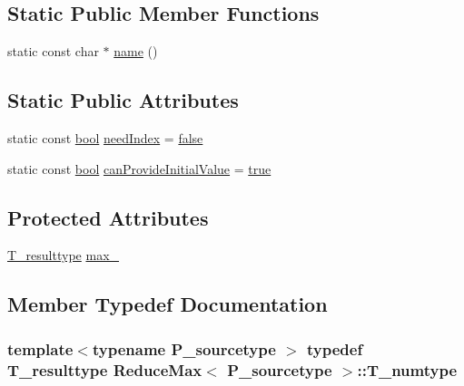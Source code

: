 \subsection*{Static Public Member Functions}
\begin{DoxyCompactItemize}
\item 
static const char $\ast$ \hyperlink{classReduceMax_abd39784338daade53da235c5cde658b5}{name} ()
\end{DoxyCompactItemize}
\subsection*{Static Public Attributes}
\begin{DoxyCompactItemize}
\item 
static const \hyperlink{compiler_8h_abb452686968e48b67397da5f97445f5b}{bool} \hyperlink{classReduceMax_a1826b9280463d17acf648acbbf255e5e}{need\+Index} = \hyperlink{compiler_8h_a65e9886d74aaee76545e83dd09011727}{false}
\item 
static const \hyperlink{compiler_8h_abb452686968e48b67397da5f97445f5b}{bool} \hyperlink{classReduceMax_a335c4053d878c33241d52e7a86656135}{can\+Provide\+Initial\+Value} = \hyperlink{compiler_8h_a41f9c5fb8b08eb5dc3edce4dcb37fee7}{true}
\end{DoxyCompactItemize}
\subsection*{Protected Attributes}
\begin{DoxyCompactItemize}
\item 
\hyperlink{classReduceMax_a5e86077304fc95a12800e10c2059f88a}{T\+\_\+resulttype} \hyperlink{classReduceMax_a232fc6ca51eddc4f596d9cd6307c7c3d}{max\+\_\+}
\end{DoxyCompactItemize}


\subsection{Member Typedef Documentation}
\hypertarget{classReduceMax_ae4efd4d75d2f9126d3191a2c96a43e96}{}
\subsubsection[{T\+\_\+numtype}]{\setlength{\rightskip}{0pt plus 5cm}template$<$typename P\+\_\+sourcetype $>$ typedef {\bf T\+\_\+resulttype} {\bf Reduce\+Max}$<$ P\+\_\+sourcetype $>$\+::{\bf T\+\_\+numtype}}\label{classReduceMax_ae4efd4d75d2f9126d3191a2c96a43e96}
\hypertarget{classReduceMax_a5e86077304fc95a12800e10c2059f88a}{}
